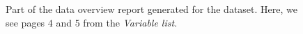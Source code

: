 \documentclass[article,shortnames]{jss}
\begin{document}
\begin{figure}[tb]
\begin{center}
\end{center}
\caption{Part of the data overview report generated for the  dataset. Here, we see pages 4 and 5 from the \textit{Variable list}.}
\label{fig:bigExampleP45}
\end{figure}
\end{document}
